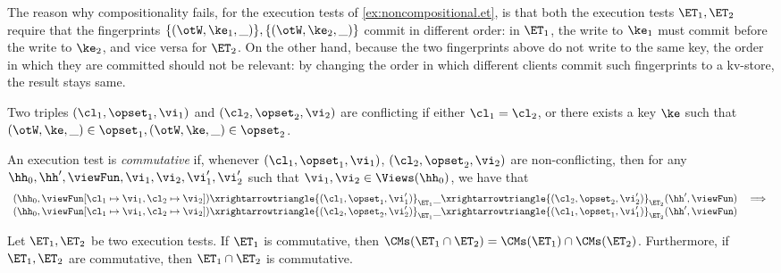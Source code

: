 The reason why compositionality fails, for the execution tests of \cref{ex:noncompositional.et}, 
is that both the execution tests $\ET_1, \ET_2$ require that the fingerprints 
$\{(\otW, \ke_1, \_)\}, \{(\otW, \ke_2, \_)\}$ commit in different order: in $\ET_1$, the write to $\ke_1$ must commit 
before the write to $\ke_2$, and vice versa for $\ET_2$. On the other hand, 
because the two fingerprints above do not write to the same key, 
the order in which they are committed should not be relevant: by changing the order 
in which different clients commit such fingerprints to a kv-store, the result stays same. 
\begin{definition}
Two triples $(\cl_1, \opset_1, \vi_1)$ and $(\cl_2, \opset_2, \vi_2)$ are 
conflicting if either $\cl_1 = \cl_2$, or there exists a key $\ke$ such that 
$(\otW, \ke, \_) \in \opset_1, (\otW, \ke, \_) \in \opset_2$. 

An execution test is \emph{commutative} if, whenever $(\cl_1, \opset_1, \vi_1)$, 
$(\cl_2, \opset_2, \vi_2)$ are non-conflicting, then for any $\hh_0, \hh', \viewFun, 
\vi_1, \vi_2, \vi_1', \vi_2'$ such that $\vi_1, \vi_2 \in \Views(\hh_0)$, we have that 
\[
\begin{array}{lr}
(\hh_0, \viewFun[\cl_1 \mapsto \vi_1, \cl_2 \mapsto \vi_2]) \xrightarrowtriangle{(\cl_1, \opset_1, \vi_1')}_{\ET_1} 
\_ \xrightarrowtriangle{(\cl_2, \opset_2, \vi_2')}_{\ET_2} (\hh', \viewFun) &\implies \\
(\hh_0, \viewFun[\cl_1 \mapsto \vi_1, \cl_2 \mapsto \vi_2]) \xrightarrowtriangle{(\cl_2, \opset_2, \vi_2')}_{\ET_1} 
\_ \xrightarrowtriangle{(\cl_1, \opset_1, \vi_1')}_{\ET_2} (\hh', \viewFun)
\end{array}
\]
\end{definition}

\begin{theorem}
Let $\ET_1, \ET_2$ be two execution tests. If $\ET_1$ is commutative, 
then $\CMs(\ET_1 \cap \ET_2) = \CMs(\ET_1) \cap \CMs(\ET_2)$. 
Furthermore, if $\ET_1, \ET_2$ are commutative, then $\ET_1 \cap \ET_2$ 
is commutative.
\end{theorem}


